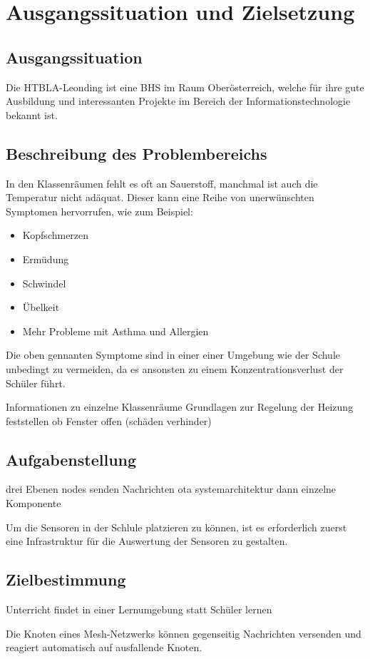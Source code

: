 \chapter{Ausgangssituation und Zielsetzung}

\section{Ausgangssituation}
Die HTBLA-Leonding ist eine BHS im Raum Oberösterreich, welche für ihre gute Ausbildung und interessanten Projekte im Bereich der Informationstechnologie bekannt ist.

\section{Beschreibung des Problembereichs}
In den Klassenräumen fehlt es oft an Sauerstoff, manchmal ist auch die Temperatur nicht adäquat. Dieser kann eine Reihe von unerwünschten Symptomen hervorrufen, wie zum Beispiel: 

\begin{itemize}
    \item Kopfschmerzen
    \item Ermüdung
    \item Schwindel
    \item Übelkeit
    \item Mehr Probleme mit Asthma und Allergien
\end{itemize}

Die oben gennanten Symptome sind in einer einer Umgebung wie der Schule unbedingt zu vermeiden, da es ansonsten zu einem Konzentrationsverlust der Schüler führt.


Informationen zu einzelne Klassenräume
Grundlagen zur Regelung der Heizung
feststellen ob Fenster offen (schäden verhinder)

\pagebreak
\section{Aufgabenstellung}
drei Ebenen
nodes senden Nachrichten
ota
systemarchitektur
dann einzelne Komponente


Um die Sensoren in der Schlule platzieren zu können, ist es erforderlich zuerst eine Infrastruktur für die Auswertung der Sensoren zu gestalten.

\section{Zielbestimmung}
Unterricht findet in einer Lernumgebung statt
Schüler lernen

Die Knoten eines Mesh-Netzwerks können gegenseitig Nachrichten versenden und reagiert automatisch auf ausfallende Knoten.